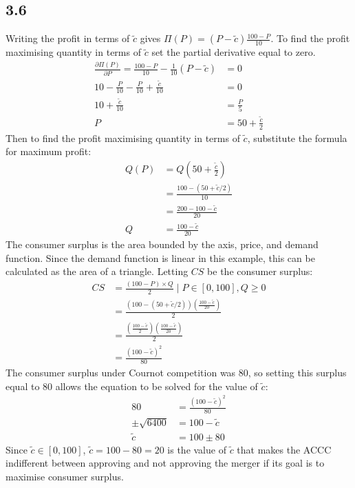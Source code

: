 \documentclass{article}
\begin{document}
\subsection*{3.6}
Writing the profit in terms of $\tilde{c}$ gives $\Pi(P) = (P - \tilde{c}) \frac{100 - P}{10}$. To find the profit maximising quantity in terms of $\tilde{c}$ set the partial derivative equal to zero.
\begin{align*}
    \frac{\partial \Pi(P)}{\partial P} = \frac{100 - P}{10} - \frac{1}{10} (P - \tilde{c}) &= 0\\
    10 - \frac{P}{10} - \frac{P}{10} + \frac{\tilde{c}}{10} &= 0\\
    10 + \frac{\tilde{c}}{10} &= \frac{P}{5}\\
    P &= 50 + \frac{\tilde{c}}{2}
\end{align*}
Then to find the profit maximising quantity in terms of $\tilde{c}$, substitute the formula for maximum profit:
\begin{align*}
    Q(P) &= Q \left( 50 + \frac{\tilde{c}}{2} \right)\\
    &= \frac{100 - (50 + \tilde{c}/2)}{10}\\
    &= \frac{200-100-\tilde{c}}{20}\\
    Q &= \frac{100 - \tilde{c}}{20}
\end{align*}
The consumer surplus is the area bounded by the axis, price, and demand function. Since the demand function is linear in this example, this can be calculated as the area of a triangle. Letting $CS$ be the consumer surplus:
\begin{align*}
    CS &= \frac{(100 - P) \times Q}{2} \mid P \in [0, 100], Q \geq 0\\
    &= \frac{(100 - (50 + \tilde{c} / 2)) \left( \frac{100 - \tilde{c}}{20} \right) }{2}\\
    &= \frac{\left( \frac{100 - \tilde{c}}{2} \right) \left( \frac{100 - \tilde{c}}{20} \right) }{2}\\
    &= \frac{(100 - \tilde{c})^{2}}{80}
\end{align*}
The consumer surplus under Cournot competition was 80, so setting this surplus equal to 80 allows the equation to be solved for the value of $\tilde{c}$:
\begin{align*}
    80 &= \frac{(100 - \tilde{c})^{2}}{80}\\
    \pm \sqrt{6400} &= 100 - \tilde{c}\\
    \tilde{c} &= 100 \pm 80
\end{align*}
Since $\tilde{c} \in [0, 100]$, $\tilde{c} = 100 - 80 = 20$ is the value of $\tilde{c}$ that makes the ACCC indifferent between approving and not approving the merger if its goal is to maximise consumer surplus.
\end{document}
